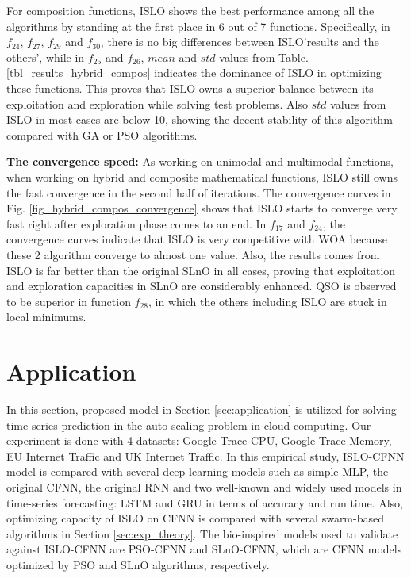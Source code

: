\documentclass[a4paper,13pt,2p]{report}
\begin{document}
	For composition functions, ISLO shows the best performance among all the algorithms by standing at the first place in 6 out of 7 functions. Specifically, in $f_{24}$, $f_{27}$, $f_{29}$ and $f_{30}$, there is no big differences between ISLO'results and the others', while in $f_{25}$ and $f_{26}$, $mean$ and $std$ values from Table. \ref{tbl_results_hybrid_compos} indicates the dominance of ISLO in optimizing these functions. This proves that ISLO owns a superior balance between its exploitation and exploration while solving test problems. Also $std$ values from ISLO in most cases are below 10, showing the decent stability of this algorithm compared with GA or PSO algorithms.
	
	\textbf{The convergence speed:} As working on unimodal and multimodal functions, when working on hybrid and composite mathematical functions, ISLO still owns the fast convergence in the second half of iterations. The convergence curves in Fig. \ref{fig_hybrid_compos_convergence} shows that ISLO starts to converge very fast right after exploration phase comes to an end. In $f_{17}$ and $f_{24}$, the convergence curves indicate that ISLO is very competitive with WOA because these 2 algorithm converge to almost one value. Also, the results comes from ISLO is far better than the original SLnO in all cases, proving that exploitation and exploration capacities in SLnO are considerably enhanced. QSO is observed to be superior in function $f_{28}$, in which the others including ISLO are stuck in local minimums.   

\section{Application}
\label{sec:exp_app}
	
	In this section, proposed model in Section \ref{sec:application} is utilized for solving time-series prediction in the auto-scaling problem in cloud computing. Our experiment is done with 4 datasets: Google Trace CPU, Google Trace Memory, EU Internet Traffic and UK Internet Traffic. In this empirical study, ISLO-CFNN model is compared with several deep learning models such as simple MLP, the original CFNN, the original RNN and two well-known and widely used models in time-series forecasting: LSTM and GRU in terms of accuracy and run time. Also, optimizing capacity of ISLO on CFNN is compared with several swarm-based algorithms in Section \ref{sec:exp_theory}. The bio-inspired models used to validate against ISLO-CFNN are PSO-CFNN and SLnO-CFNN, which are CFNN models optimized by PSO and SLnO algorithms, respectively.
	
\end{document}
